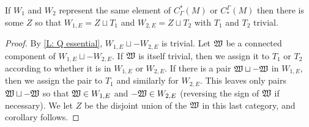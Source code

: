 \begin{corollary}\label{C: Q essential}
If $W_1$ and $W_2$ represent the same element of $C^*_\Gamma(M)$ or $C_*^\Gamma(M)$ then there is some $Z$ so that $W_{1,E} = Z\sqcup T_1$ and $W_{2,E} = Z\sqcup T_2$ with $T_1$ and $T_2$ trivial.
\end{corollary}
\begin{proof}
By \cref{L: Q essential}, $W_{1,E}\sqcup -W_{2,E}$ is trivial. Let $\mathfrak W$ be a connected component of $W_{1,E}\sqcup -W_{2,E}$. If $\mathfrak W$ is itself trivial, then we assign it to $T_1$ or $T_2$ according to whether it is in $W_{1,E}$ or $W_{2,E}$. If there is a pair $\mathfrak W\sqcup -\mathfrak W$ in $W_{1,E}$, then we assign the pair to $T_1$ and similarly for $W_{2,E}$. This leaves only pairs $\mathfrak W\sqcup -\mathfrak W$ so that $\mathfrak W \in W_{1,E}$ and $-\mathfrak W \in W_{2,E}$ (reversing the sign of $\mathfrak W$ if necessary). We let $Z$ be the disjoint union of the $\mathfrak W$ in this last category, and corollary follows.
\end{proof}




